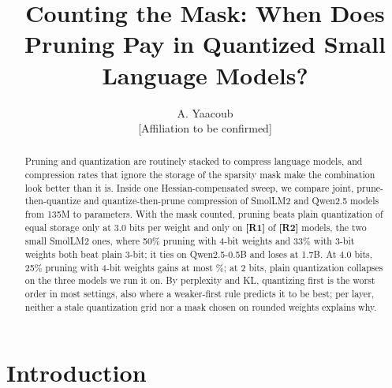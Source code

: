 \documentclass{esannV2}
\newcommand{\TBD}[1]{\textbf{[#1]}}
\providecommand{\resFrontierThreeWins}{\TBD{R1}}
\providecommand{\resFrontierThreeModels}{\TBD{R2}}
\begin{document}
\title{Counting the Mask: When Does Pruning Pay in Quantized Small Language Models?}

\author{A. Yaacoub
%
\vspace{.3cm}\\
%
{[Affiliation to be confirmed]}
}

\maketitle

\begin{abstract}
Pruning and quantization are routinely stacked to compress language models,
and compression rates that ignore the storage of the sparsity mask make the
combination look better than it is. Inside one Hessian-compensated sweep, we
compare joint, prune-then-quantize and quantize-then-prune compression of
SmolLM2 and Qwen2.5 models from 135M to \largestmodel{} parameters. With the
mask counted, pruning beats plain quantization of equal storage only at 3.0
bits per weight and only on \resFrontierThreeWins{} of
\resFrontierThreeModels{} models, the two small SmolLM2 ones, where 50\%
pruning with 4-bit weights and 33\% with 3-bit weights both beat plain 3-bit;
it ties on Qwen2.5-0.5B and loses at 1.7B. At 4.0 bits, 25\% pruning with
4-bit weights gains at most \resFrontierFourGainMaxPct\%; at 2 bits, plain
quantization collapses on the three models we run it on. By perplexity and KL, quantizing first is the worst
order in most settings, also where a weaker-first rule predicts it to be best;
per layer, neither a stale quantization grid nor a mask chosen on rounded
weights explains why.
\end{abstract}

\section{Introduction}
\end{document}
